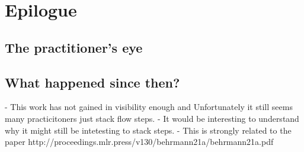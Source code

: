 \section{Epilogue}

\subsection{The practitioner's eye}

\subsection{What happened since then?}
- This work has not gained in visibility enough and Unfortunately it still seems many practicitoners just stack flow steps.
- It would be interesting to understand why it might still be intetesting to stack steps.
- This is strongly related to the paper http://proceedings.mlr.press/v130/behrmann21a/behrmann21a.pdf
